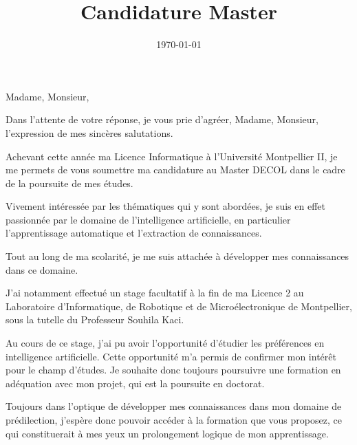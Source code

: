 \documentclass[12pt,letterpaper, roman]{moderncv}
\title{Candidature Master}
\begin{document}
\date{\today}
\opening{Madame, Monsieur, }
\closing{Dans l'attente de votre r\'{e}ponse, je vous prie d'agr\'{e}er, Madame, Monsieur, l'expression de mes sinc\`{e}res salutations.}
\makelettertitle

\par Achevant cette ann\'{e}e ma Licence Informatique \`{a} l'Universit\'{e} Montpellier II, je me permets de vous soumettre ma candidature au Master DECOL dans le cadre de la poursuite de mes \'{e}tudes.
\par Vivement int\'{e}ress\'{e}e par les th\'{e}matiques qui y sont abord\'{e}es, je suis en effet passionn\'{e}e par le domaine de l'intelligence artificielle, en particulier l'apprentissage automatique et l'extraction de connaissances.
\par Tout au long de ma scolarit\'{e}, je me suis attach\'{e}e \`{a} d\'{e}velopper mes connaissances dans ce domaine. 
\par J'ai notamment effectu\'{e} un stage facultatif \`{a} la fin de ma Licence 2 au Laboratoire d'Informatique, de Robotique et de Micro\'{e}lectronique de Montpellier, sous la tutelle du Professeur Souhila Kaci. 
\par Au cours de ce stage, j'ai pu avoir l'opportunit\'{e} d'\'{e}tudier les pr\'{e}f\'{e}rences en intelligence artificielle. Cette opportunit\'{e} m'a permis de confirmer mon int\'{e}r\^{e}t pour le champ d'\'{e}tudes. Je souhaite donc toujours poursuivre une formation en ad\'{e}quation avec mon projet, qui est la poursuite en doctorat.
\par Toujours dans l'optique de d\'{e}velopper mes connaissances dans mon domaine de pr\'{e}dilection, j'esp\`{e}re donc pouvoir acc\'{e}der \`{a} la formation que vous proposez, ce qui constituerait \`{a} mes yeux un prolongement logique de mon apprentissage.

\makeletterclosing
\end{document}

